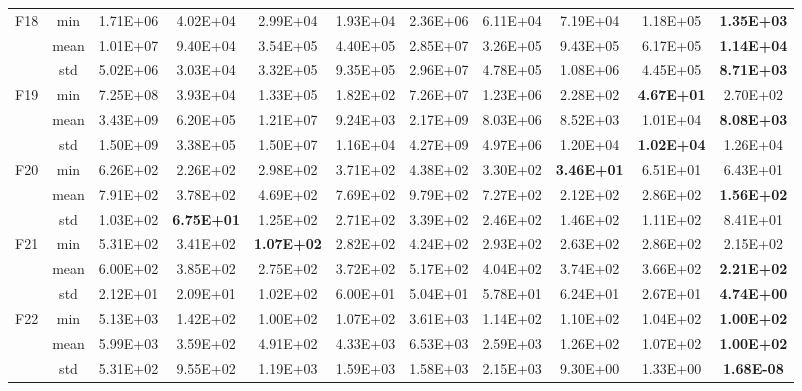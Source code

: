 \documentclass[preprint,review,compress,12pt]{elsarticle}
\begin{document}
\begin{table}[H]
{\begin{tabular}{ccccccccccc}
    \multirow{3}[0]{*}{F18} & min   & 1.71E+06 & 4.02E+04 & 2.99E+04 & 1.93E+04 & 2.36E+06 & 6.11E+04 & 7.19E+04 & 1.18E+05 & \textbf{1.35E+03} \\
          & mean  & 1.01E+07 & 9.40E+04 & 3.54E+05 & 4.40E+05 & 2.85E+07 & 3.26E+05 & 9.43E+05 & 6.17E+05 & \textbf{1.14E+04} \\
          & std   & 5.02E+06 & 3.03E+04 & 3.32E+05 & 9.35E+05 & 2.96E+07 & 4.78E+05 & 1.08E+06 & 4.45E+05 & \textbf{8.71E+03} \\
    \multirow{3}[0]{*}{F19} & min   & 7.25E+08 & 3.93E+04 & 1.33E+05 & 1.82E+02 & 7.26E+07 & 1.23E+06 & 2.28E+02 & \textbf{4.67E+01} & 2.70E+02 \\
          & mean  & 3.43E+09 & 6.20E+05 & 1.21E+07 & 9.24E+03 & 2.17E+09 & 8.03E+06 & 8.52E+03 & 1.01E+04 & \textbf{8.08E+03} \\
          & std   & 1.50E+09 & 3.38E+05 & 1.50E+07 & 1.16E+04 & 4.27E+09 & 4.97E+06 & 1.20E+04 & \textbf{1.02E+04} & 1.26E+04 \\
    \multirow{3}[0]{*}{F20} & min   & 6.26E+02 & 2.26E+02 & 2.98E+02 & 3.71E+02 & 4.38E+02 & 3.30E+02 & \textbf{3.46E+01} & 6.51E+01 & 6.43E+01 \\
          & mean  & 7.91E+02 & 3.78E+02 & 4.69E+02 & 7.69E+02 & 9.79E+02 & 7.27E+02 & 2.12E+02 & 2.86E+02 & \textbf{1.56E+02} \\
          & std   & 1.03E+02 & \textbf{6.75E+01} & 1.25E+02 & 2.71E+02 & 3.39E+02 & 2.46E+02 & 1.46E+02 & 1.11E+02 & 8.41E+01 \\
    \multirow{3}[0]{*}{F21} & min   & 5.31E+02 & 3.41E+02 & \textbf{1.07E+02} & 2.82E+02 & 4.24E+02 & 2.93E+02 & 2.63E+02 & 2.86E+02 & 2.15E+02 \\
          & mean  & 6.00E+02 & 3.85E+02 & 2.75E+02 & 3.72E+02 & 5.17E+02 & 4.04E+02 & 3.74E+02 & 3.66E+02 & \textbf{2.21E+02} \\
          & std   & 2.12E+01 & 2.09E+01 & 1.02E+02 & 6.00E+01 & 5.04E+01 & 5.78E+01 & 6.24E+01 & 2.67E+01 & \textbf{4.74E+00} \\
    \multirow{3}[0]{*}{F22} & min   & 5.13E+03 & 1.42E+02 & 1.00E+02 & 1.07E+02 & 3.61E+03 & 1.14E+02 & 1.10E+02 & 1.04E+02 & \textbf{1.00E+02} \\
          & mean  & 5.99E+03 & 3.59E+02 & 4.91E+02 & 4.33E+03 & 6.53E+03 & 2.59E+03 & 1.26E+02 & 1.07E+02 & \textbf{1.00E+02} \\
          & std   & 5.31E+02 & 9.55E+02 & 1.19E+03 & 1.59E+03 & 1.58E+03 & 2.15E+03 & 9.30E+00 & 1.33E+00 & \textbf{1.68E-08} \\

\end{tabular}}
\end{table}
\end{document}
